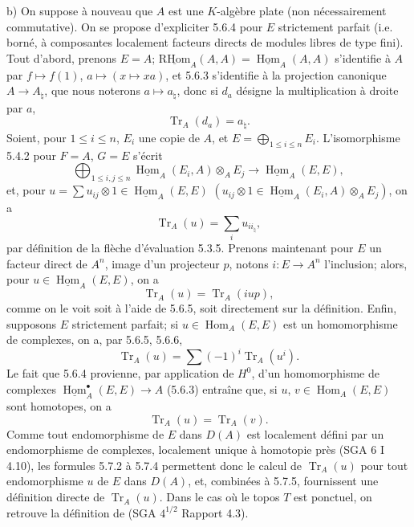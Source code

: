 \documentclass[11pt]{article}
\DeclareMathOperator{\Hom}{Hom}
\newcommand{\R}{\mathrm{R}}\newcommand{\RHomCore}{\mathrm{RHom}}
\providecommand{\RHom}{\RHomCore}
\providecommand{\uRHom}{\underline{\RHom}}
\providecommand{\uHom}{\underline{\Hom}}
\providecommand{\Tr}{\operatorname{Tr}}
\providecommand{\Tr}{\operatorname{Tr}}
\providecommand{\Tr}{\operatorname{Tr}}
\providecommand{\RHom}{\RHomCore}
\providecommand{\Hom}{\operatorname{Hom}}
\providecommand{\RHom}{\R\mathcal{H}om}
\providecommand{\R}{\mathrm R}
\providecommand{\Tr}{\operatorname{Tr}}
\providecommand{\RHom}{\RHomCore}
\providecommand{\Hom}{\operatorname{Hom}}
\providecommand{\Tr}{\operatorname{Tr}}
\begin{document}
b) On suppose à nouveau que $A$ est une $K$-algèbre plate (non nécessairement commutative). On se propose d'expliciter 5.6.4 pour $E$ strictement parfait (i.e. borné, à composantes localement facteurs directs de modules libres de type fini). Tout d'abord, prenons $E=A$; $\uRHom_A(A,A)=\uHom_A(A,A)$ s'identifie à $A$ par $f\mapsto f(1)$, $a\mapsto(x\mapsto xa)$, et 5.6.3 s'identifie à la projection canonique $A\to A_\natural$, que nous noterons $a\mapsto a_\natural$, donc si $d_a$ désigne la multiplication à droite par $a$,
\begin{equation}\tag{5.7.1}
\Tr_A(d_a)=a_\natural.
\end{equation}
Soient, pour $1\le i\le n$, $E_i$ une copie de $A$, et $E=\bigoplus_{1\le i\le n}E_i$. L'isomorphisme 5.4.2 pour $F=A$, $G=E$ s'écrit
\[
\bigoplus_{1\le i,j\le n}\uHom_A(E_i,A)\otimes_AE_j\longrightarrow\uHom_A(E,E),
\]
et, pour $u=\sum u_{ij}\otimes 1\in\uHom_A(E,E)$ $(u_{ij}\otimes 1\in\uHom_A(E_i,A)\otimes_A E_j)$, on a
\begin{equation}\tag{5.7.2}
\Tr_A(u)=\sum_i u_{ii_\natural},
\end{equation}
par définition de la flèche d'évaluation 5.3.5. Prenons maintenant pour $E$ un facteur direct de $A^n$, image d'un projecteur $p$, notons $i:E\to A^n$ l'inclusion; alors, pour $u\in\uHom_A(E,E)$, on a
\begin{equation}\tag{5.7.3}
\Tr_A(u)=\Tr_A(iup),
\end{equation}
comme on le voit soit à l'aide de 5.6.5, soit directement sur la définition. Enfin, supposons $E$ strictement parfait; si $u\in\Hom_A(E,E)$ est un homomorphisme de complexes, on a, par 5.6.5, 5.6.6,
\begin{equation}\tag{5.7.4}
\Tr_A(u)=\sum(-1)^i\Tr_A(u^i).
\end{equation}
Le
fait que 5.6.4 provienne, par application de $H^0$, d'un homomorphisme de complexes $\uHom_A^\bullet(E,E)\to A$ (5.6.3) entraîne que, si $u$, $v\in\Hom_A(E,E)$ sont homotopes, on a
\begin{equation}\tag{5.7.5}
\Tr_A(u)=\Tr_A(v).
\end{equation}
Comme tout endomorphisme de $E$ dans $D(A)$ est localement défini par un endomorphisme de complexes, localement unique à homotopie près (SGA 6 I 4.10), les formules 5.7.2 à 5.7.4 permettent donc le calcul de $\Tr_A(u)$ pour tout endomorphisme $u$ de $E$ dans $D(A)$, et, combinées à 5.7.5, fournissent une définition directe de $\Tr_A(u)$. Dans le cas où le topos $T$ est ponctuel, on retrouve la définition de (SGA $4^{1/2}$ Rapport 4.3).
\end{document}
